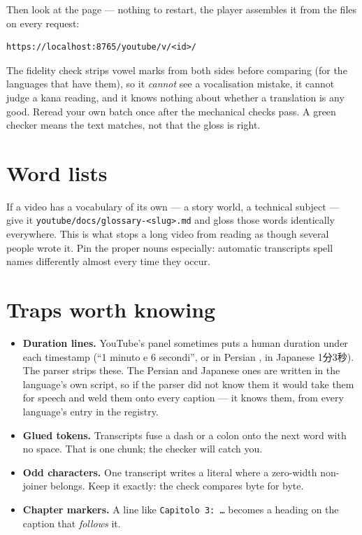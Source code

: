 \documentclass[11pt,oneside]{report}
\newcommand{\pw}[1]{\babelsublr{\mbox{\foreignlanguage{persian}{#1}}}}
\newcommand{\jw}[1]{\mbox{\foreignlanguage{japanese}{#1}}}
\newcommand{\file}[1]{\texttt{#1}}
\begin{document}
Then look at the page --- nothing to restart, the player assembles it from
the files on every request:

\begin{lstlisting}
https://localhost:8765/youtube/v/<id>/
\end{lstlisting}

\begin{warnbox}
The fidelity check strips vowel marks from both sides before comparing (for
the languages that have them), so it \emph{cannot} see a vocalisation
mistake, it cannot judge a kana reading, and it knows nothing about whether
a translation is any good. Reread your own batch once after the mechanical
checks pass. A green checker means the text matches, not that the gloss is
right.
\end{warnbox}

\section{Word lists}

If a video has a vocabulary of its own --- a story world, a technical
subject --- give it \file{youtube/docs/glossary-<slug>.md} and gloss those
words identically everywhere. This is what stops a long video from reading
as though several people wrote it. Pin the proper nouns especially:
automatic transcripts spell names differently almost every time they occur.

\section{Traps worth knowing}

\begin{itemize}
\item \textbf{Duration lines.} YouTube's panel sometimes puts a human
  duration under each timestamp (``1 minuto e 6 secondi'', or in Persian
  \pw{۱ دقیقه و ۳ ثانیه}, in Japanese \jw{1分3秒}). The parser strips these.
  The Persian and Japanese ones are written in the language's own script,
  so if the parser did not know them it would take them for speech and weld
  them onto every caption --- it knows them, from every language's entry in
  the registry.
\item \textbf{Glued tokens.} Transcripts fuse a dash or a colon onto the
  next word with no space. That is one chunk; the checker will catch you.
\item \textbf{Odd characters.} One transcript writes a literal
  \texttt{\textlnot} where a zero-width non-joiner belongs. Keep it exactly:
  the check compares byte for byte.
\item \textbf{Chapter markers.} A line like \texttt{Capitolo 3: \ldots}
  becomes a heading on the caption that \emph{follows} it.
\end{itemize}
\end{document}
